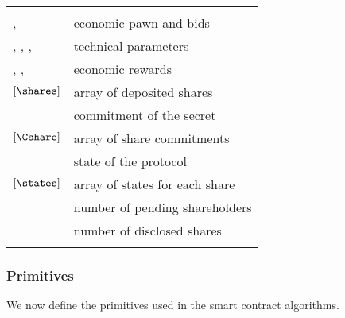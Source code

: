 
\begin{tabular}{ll}
	& \\
	
	\PO, \BH & economic pawn and bids \\
	\td, \te, \N, \K & technical parameters\\
	\RH, \Wsecret, \Wshare & economic rewards \\
	$\left[ \shares \right]$ & array of deposited shares \\
	\Csecret & commitment of the secret \\
	$\left[ \Cshare \right]$ & array of share commitments \\	
	\state & state of the \shortname protocol \\
	$\left[ \states \right]$& array of states for each share \\
	\numpending & number of pending shareholders \\
	\numdisclosed & number of disclosed shares \\
	& \\
\end{tabular}

\subsubsection*{Primitives}
We now define the primitives used in the \shortname smart contract algorithms.

